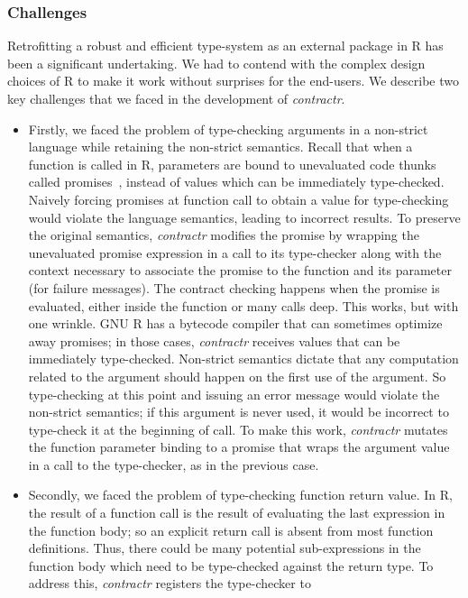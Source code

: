 \documentclass[acmsmall,review,anonymous]{acmart}\settopmatter{printfolios=true,printccs=false,printacmref=false}
\newcommand{\contractr}{\emph{contractr}\xspace} %
\begin{document}
%
%
\subsubsection{Challenges}
Retrofitting a robust and efficient type-system as an external package in R has
been a significant undertaking. We had to contend with the complex design
choices of R to make it work without surprises for the end-users. We describe
two key challenges that we faced in the development of \contractr.
\begin{itemize}
\item Firstly, we faced the problem of type-checking arguments in a
  non-strict language while retaining the non-strict semantics. Recall that when a
  function is called in R, parameters are bound to unevaluated code thunks
  called promises~\cite{oopsla19}, instead of values which can be
  immediately type-checked. Naively forcing promises at function call to
  obtain a value for type-checking would violate the language semantics,
  leading to incorrect results. To preserve the original semantics,
  \contractr modifies the promise by wrapping the unevaluated promise
  expression in a call to its type-checker along with the context necessary
  to associate the promise to the function and its parameter (for failure
  messages). The contract checking happens when the promise is evaluated,
  either inside the function or many calls deep.  This works, but with one
  wrinkle. GNU R has a bytecode compiler that can sometimes optimize away
  promises; in those cases, \contractr receives values that can be
  immediately type-checked. Non-strict semantics dictate that any
  computation related to the argument should happen on the first use of the
  argument. So type-checking at this point and issuing an error message
  would violate the non-strict semantics; if this argument is never used, it
  would be incorrect to type-check it at the beginning of call. To make this
  work, \contractr mutates the function parameter binding to a promise that
  wraps the argument value in a call to the type-checker, as in the previous
  case.
\item Secondly, we faced the problem of type-checking function return
  value. In R, the result of a function call is the result of evaluating the
  last expression in the function body; so an explicit return call is absent
  from most function definitions. Thus, there could be many potential
  sub-expressions in the function body which need to be type-checked against
  the return type. To address this, \contractr registers the type-checker to

\end{itemize}
\end{document}
